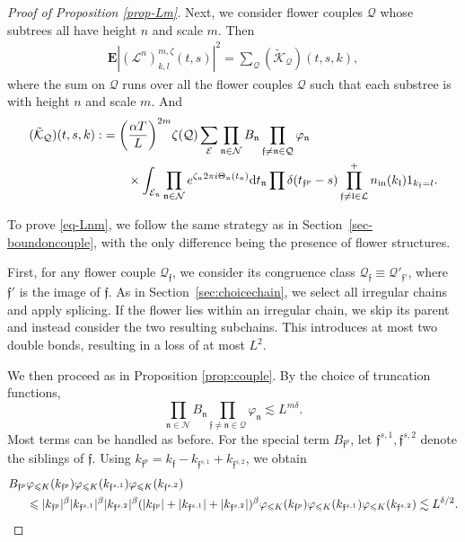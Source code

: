 \documentclass[UTF-8,reqno]{amsart}
\numberwithin{equation}{section}
\theoremstyle{definition}
\def\dif{{\mathord{{\rm d}}}}
\def\leq{\leqslant}
\def\dif{{\mathord{{\rm d}}}}
\def\leq{\leqslant}
\begin{document}
\begin{proof}[Proof of Proposition \ref{prop-Lm}]
Next, we consider flower couples $\mathcal{Q}$ whose subtrees all have height $n$ and scale $m$. Then
 \begin{align*}
     \mathbf{E} |(\mathscr L^{n})_{k, l}^{m, \zeta}(t,s)|^2 =\sum_{\mathcal{Q}} (\tilde{\mathcal{K}}_\mathcal{Q})(t,s,k), 
 \end{align*}
 where the sum on $\mathcal{Q}$ runs over all the flower couples $\mathcal{Q} $ such that each substree is with  height $n$ and scale $m$. And 
 \begin{align*}
   (\tilde{\mathcal{K}}_\mathcal{Q})(t,s,k):&= \bigg(\frac{\alpha T}{L}\bigg)^{2m} \zeta(\mathcal{Q}) \sum_{\mathcal{E}}  %
   \prod_{\mathfrak{n}\in\mathcal{N}}B_\mathfrak{n}\prod_{\mathfrak{f}\neq \mathfrak{n}\in\mathcal{Q}}\varphi_\mathfrak{n}\\
  &\quad\quad \times 
\int_{\mathcal{E}_\mathfrak{n}}\prod_{\mathfrak{n}\in\mathcal{N}}  e^{\zeta_\mathfrak{n}2\pi i\Theta_\mathfrak{n}(t_\mathfrak{n}) } \dif t_\mathfrak{n}\prod\delta({t_{\mathfrak{f}^p}-s)}
\prod_{\mathfrak{f}\neq \mathfrak{l} \in \mathcal{L}}^+ n_{\rm in}(k_{\mathfrak{l}})1_{k_\mathfrak{f}=l}.
 \end{align*}
 
To prove \eqref{eq-Lnm}, we follow the same strategy as in Section~\ref{sec-boundoncouple}, with the only difference being the presence of flower structures.
 
First, for any flower couple $\mathcal{Q}_{\mathfrak{f}}$, we consider its congruence class $\mathcal{Q}_{\mathfrak{f}}\equiv \mathcal{Q}'_{\mathfrak{f}'}$, where $\mathfrak{f}'$ is the image of $\mathfrak{f}$. As in Section~\ref{sec:choicechain}, we select all irregular chains and apply splicing. If the flower lies within an irregular chain, we skip its parent and instead consider the two resulting subchains. This introduces at most two double bonds, resulting in a loss of at most $L^{2}$.

 
We then proceed as in Proposition \ref{prop:couple}. By the choice of truncation functions,
 $$\prod_{\mathfrak{n}\in\mathcal{N}}B_\mathfrak{n}\prod_{\mathfrak{f}\neq \mathfrak{n}\in\mathcal{Q}}\varphi_\mathfrak{n}\lesssim L^{m\delta}.$$
 Most terms can be handled as before. For the special term $B_{\mathfrak{f}^p}$, let $\mathfrak{f}^{s,1},\mathfrak{f}^{s,2}$ denote the siblings of $\mathfrak{f}$. Using
 $k_{\mathfrak{f}^{p}}=k_{\mathfrak{f}}-k_{\mathfrak{f}^{s,1}}+k_{\mathfrak{f}^{s,2}}$, we obtain
\begin{align}
B_{\mathfrak{f}^p}&\varphi_{\leq K}(k_{\mathfrak{f}^{p}})\varphi_{\leq K}(k_{\mathfrak{f}^{s,1}})\varphi_{\leq K}(k_{\mathfrak{f}^{s,2}})\notag\\
    &\leq |k_{\mathfrak{f}^p}|^{\beta}|k_{\mathfrak{f}^{s,1}}|^{\beta}|k_{\mathfrak{f}^{s,2}}|^{\beta}(|k_{\mathfrak{f}^p}|+|k_{\mathfrak{f}^{s,1}}|+|k_{\mathfrak{f}^{s,2}}|)^{\beta}\varphi_{\leq K}(k_{\mathfrak{f}^{p}})\varphi_{\leq K}(k_{\mathfrak{f}^{s,1}})\varphi_{\leq K}(k_{\mathfrak{f}^{s,2}})\lesssim L^{\delta/2}.\label{bd:flowerB}
\end{align}


\end{proof}
\end{document}
